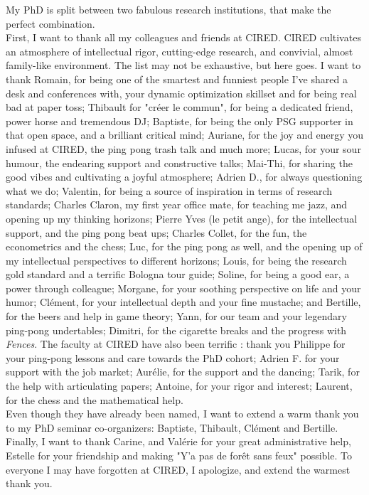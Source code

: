 My PhD is split between two fabulous research institutions, that make the perfect combination.
\\
First, I want to thank all my colleagues and friends at CIRED. CIRED cultivates an atmosphere of intellectual rigor, cutting-edge research, and convivial, almost family-like environment. The list may not be exhaustive, but here goes. 
%
I want to thank Romain, for being one of the smartest and funniest people I've shared a desk and conferences with, your dynamic optimization skillset and for being real bad at paper toss; Thibault for "créer le commun", for being a dedicated friend, power horse and tremendous DJ; Baptiste, for being the only PSG supporter in that open space, and a brilliant critical mind;  Auriane, for the joy and energy you infused at CIRED, the ping pong trash talk and much more; Lucas, for your sour humour, the endearing support and constructive talks; Mai-Thi, for sharing the good vibes and cultivating a joyful atmosphere; Adrien D., for always questioning what we do; Valentin, for being a source of inspiration in terms of research standards; Charles Claron, my first year office mate, for teaching me jazz, and opening up my thinking horizons; Pierre Yves (le petit ange), for the intellectual support, and the ping pong beat ups; Charles Collet, for the fun, the econometrics and the chess; Luc, for the ping pong as well, and the opening up of my intellectual perspectives to different horizons; Louis, for being the research gold standard and a terrific Bologna tour guide; Soline, for being a good ear, a power through colleague; Morgane, for your soothing perspective on life and your humor; Clément, for your intellectual depth and your fine mustache; and Bertille, for the beers and help in game theory; Yann, for our team and your legendary ping-pong undertables; Dimitri, for the cigarette breaks and the progress with \textit{Fences}. The faculty at CIRED have also been terrific : thank you Philippe for your ping-pong lessons and care towards the PhD cohort; Adrien F. for your support with the job market; Aurélie, for the support and the dancing; Tarik, for the help with articulating papers; Antoine, for your rigor and interest; Laurent, for the chess and the mathematical help. 
\\
Even though they have already been named, I want to extend a warm thank you to my  PhD seminar co-organizers: Baptiste, Thibault, Clément and Bertille. \\
Finally, I want to thank Carine, and Valérie for your great administrative help, Estelle for your friendship and making "Y'a pas de forêt sans feux" possible. To everyone I may have forgotten at CIRED, I apologize, and extend the warmest thank you. 
